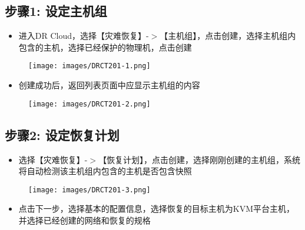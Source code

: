 \subsection{步骤1: 设定主机组}
\label{步骤1:设定主机组}

\begin{itemize}
\item 进入DR Cloud，选择【灾难恢复】-$>$【主机组】，点击创建，选择主机组内包含的主机，选择已经保护的物理机，点击创建

\end{itemize}

\begin{figure}[htbp]
\centering
\texttt{[image: images/DRCT201-1.png]}
\end{figure}

\begin{itemize}
\item 创建成功后，返回列表页面中应显示主机组的内容

\end{itemize}

\begin{figure}[htbp]
\centering
\texttt{[image: images/DRCT201-2.png]}
\end{figure}

\subsection{步骤2: 设定恢复计划}
\label{步骤2:设定恢复计划}

\begin{itemize}
\item 选择【灾难恢复】-$>$【恢复计划】，点击创建，选择刚刚创建的主机组，系统将自动检测该主机组内包含的主机是否包含快照

\end{itemize}

\begin{figure}[htbp]
\centering
\texttt{[image: images/DRCT201-3.png]}
\end{figure}

\begin{itemize}
\item 点击下一步，选择基本的配置信息，选择恢复的目标主机为KVM平台主机，并选择已经创建的网络和恢复的规格

\end{itemize}

